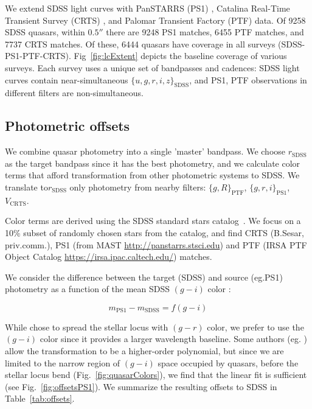 \documentclass[twocolumn]{aastex62}
\begin{document}
We extend SDSS  light curves with PanSTARRS (PS1) \citep{chambers2011,flewelling2018}, Catalina Real-Time Transient Survey (CRTS) \citep{drake2009}, and Palomar Transient Factory (PTF) \citep{rau2009} data. Of 9258  SDSS quasars, within $0.5 ''$ there are 9248 PS1 matches, 6455 PTF matches, and 7737 CRTS matches. Of these, 6444 quasars have coverage in all surveys (SDSS-PS1-PTF-CRTS).  Fig~\ref{fig:lcExtent}  depicts the  baseline coverage of various surveys.  Each survey uses a unique set of bandpasses and cadences: SDSS light curves contain near-simultaneous $\{u,g,r,i,z\}_{\mathrm{SDSS}}$, and PS1, PTF observations in different filters are  non-simultaneous.%

\subsection{Photometric offsets}

We combine quasar photometry into a single 'master' bandpass.  We choose  $r_{\mathrm{SDSS}}$ as the target bandpass since it has the best photometry, and we calculate color terms that afford transformation from other photometric systems to SDSS. We translate to$r_{\mathrm{SDSS}}$ only photometry from nearby filters: $\{g,R\}_{\mathrm{PTF}}$, $\{g,r,i\}_{\mathrm{PS1}}$, $V_{\mathrm{CRTS}}$. 

Color terms are derived using the SDSS standard stars catalog~\citep{ivezic2007}.  We focus on a 10\% subset of randomly chosen stars from the catalog, and find CRTS (B.Sesar, priv.comm.), PS1 (from MAST \url{http://panstarrs.stsci.edu}) and PTF (IRSA PTF Object Catalog \url{https://irsa.ipac.caltech.edu/}) matches. 

We consider the difference  between the target (SDSS) and source (eg.PS1) photometry as a function of the mean SDSS $(g-i)$ color : 


\begin{equation}
m_{\mathrm{PS1}} - m_{\mathrm{SDSS}} = f(g-i)
\end{equation}

While \cite{tonry2012} chose to spread the stellar locus with $(g-r)$ color, we prefer to use the $(g-i)$ color since it provides a larger wavelength baseline. Some authors (eg. \citet{li2018}) allow the transformation to be a higher-order polynomial, but since we are limited to the narrow region of $(g-i)$ space occupied by quasars, before the stellar locus bend (Fig.~\ref{fig:quasarColors}), we find that the linear fit is sufficient (see Fig.~\ref{fig:offsetsPS1}). We summarize the resulting offsets to SDSS in Table~\ref{tab:offsets}.
\end{document}
